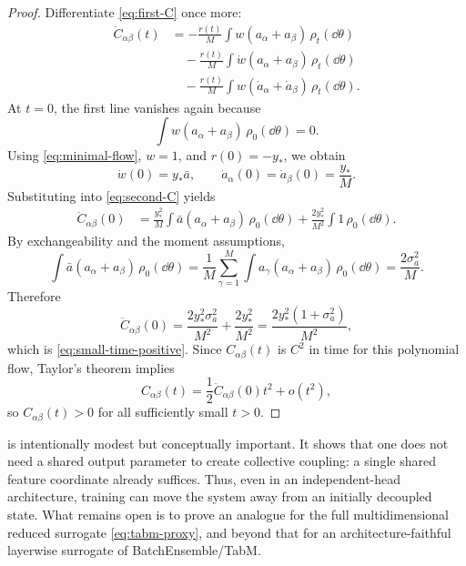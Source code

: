 \begin{proof}
Differentiate \eqref{eq:first-C} once more:
\begin{align}
  \ddot C_{\alpha\beta}(t)
  &=
  -\frac{\dot r(t)}{M}
  \int w(a_\alpha+a_\beta)\,\rho_t(\dd \theta)
  \nonumber\\
  &\quad
  -\frac{r(t)}{M}
  \int \dot w (a_\alpha+a_\beta)\,\rho_t(\dd \theta)
  \nonumber\\
  &\quad
  -\frac{r(t)}{M}
  \int w(\dot a_\alpha+\dot a_\beta)\,\rho_t(\dd \theta).
  \label{eq:second-C}
\end{align}
At $t=0$, the first line vanishes again because
\[
  \int w(a_\alpha+a_\beta)\,\rho_0(\dd \theta)=0.
\]
Using \eqref{eq:minimal-flow}, $w=1$, and $r(0)=-y_*$, we obtain
\[
  \dot w(0)=y_* \bar a,
  \qquad
  \dot a_\alpha(0)=\dot a_\beta(0)=\frac{y_*}{M}.
\]
Substituting into \eqref{eq:second-C} yields
\begin{align*}
  \ddot C_{\alpha\beta}(0)
  &=
  \frac{y_*^2}{M}
  \int \bar a(a_\alpha+a_\beta)\,\rho_0(\dd \theta)
  +
  \frac{2y_*^2}{M^2}
  \int 1\,\rho_0(\dd \theta).
\end{align*}
By exchangeability and the moment assumptions,
\[
  \int \bar a(a_\alpha+a_\beta)\,\rho_0(\dd \theta)
  =
  \frac1M
  \sum_{\gamma=1}^M
  \int a_\gamma(a_\alpha+a_\beta)\,\rho_0(\dd \theta)
  =
  \frac{2\sigma_a^2}{M}.
\]
Therefore
\[
  \ddot C_{\alpha\beta}(0)
  =
  \frac{2y_*^2 \sigma_a^2}{M^2}
  +
  \frac{2y_*^2}{M^2}
  =
  \frac{2y_*^2(1+\sigma_a^2)}{M^2},
\]
which is \eqref{eq:small-time-positive}.
Since $C_{\alpha\beta}(t)$ is $C^2$ in time for this polynomial flow,
Taylor's theorem implies
\[
  C_{\alpha\beta}(t)
  =
  \frac12 \ddot C_{\alpha\beta}(0)t^2 + o(t^2),
\]
so $C_{\alpha\beta}(t)>0$ for all sufficiently small $t>0$.
\end{proof}

\begin{remark}
 is intentionally modest but conceptually important.
It shows that one does not need a shared output parameter to create collective coupling:
a single shared feature coordinate already suffices.
Thus, even in an independent-head architecture, training can move the system away from an initially decoupled state.
What remains open is to prove an analogue for the full multidimensional reduced surrogate \eqref{eq:tabm-proxy},
and beyond that for an architecture-faithful layerwise surrogate of BatchEnsemble/TabM.
\end{remark}

